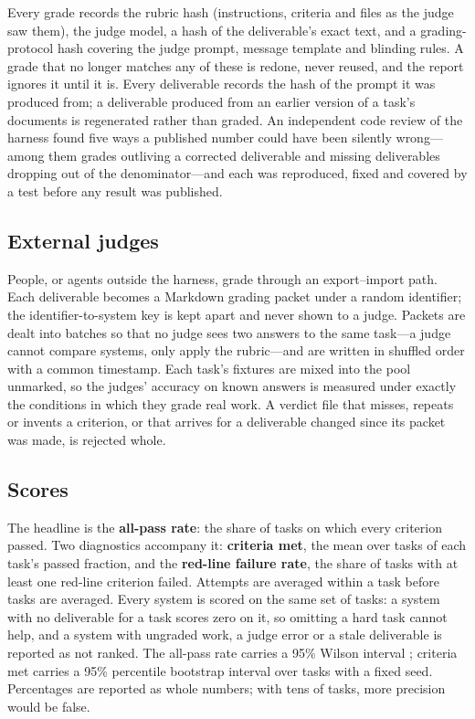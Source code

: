 \documentclass[11pt,a4paper]{article}
\begin{document}
Every grade records the rubric hash (instructions, criteria and files as the judge saw them), the judge model, a hash of the deliverable's exact text, and a grading-protocol hash covering the judge prompt, message template and blinding rules. A grade that no longer matches any of these is redone, never reused, and the report ignores it until it is. Every deliverable records the hash of the prompt it was produced from; a deliverable produced from an earlier version of a task's documents is regenerated rather than graded. An independent code review of the harness found five ways a published number could have been silently wrong---among them grades outliving a corrected deliverable and missing deliverables dropping out of the denominator---and each was reproduced, fixed and covered by a test before any result was published.

\subsection{External judges}

People, or agents outside the harness, grade through an export--import path. Each deliverable becomes a Markdown grading packet under a random identifier; the identifier-to-system key is kept apart and never shown to a judge. Packets are dealt into batches so that no judge sees two answers to the same task---a judge cannot compare systems, only apply the rubric---and are written in shuffled order with a common timestamp. Each task's fixtures are mixed into the pool unmarked, so the judges' accuracy on known answers is measured under exactly the conditions in which they grade real work. A verdict file that misses, repeats or invents a criterion, or that arrives for a deliverable changed since its packet was made, is rejected whole.

\subsection{Scores}

The headline is the \textbf{all-pass rate}: the share of tasks on which every criterion passed. Two diagnostics accompany it: \textbf{criteria met}, the mean over tasks of each task's passed fraction, and the \textbf{red-line failure rate}, the share of tasks with at least one red-line criterion failed. Attempts are averaged within a task before tasks are averaged. Every system is scored on the same set of tasks: a system with no deliverable for a task scores zero on it, so omitting a hard task cannot help, and a system with ungraded work, a judge error or a stale deliverable is reported as not ranked. The all-pass rate carries a 95\% Wilson interval \citep{wilson1927probable}; criteria met carries a 95\% percentile bootstrap interval over tasks \citep{efron1993introduction} with a fixed seed. Percentages are reported as whole numbers; with tens of tasks, more precision would be false.
\end{document}
